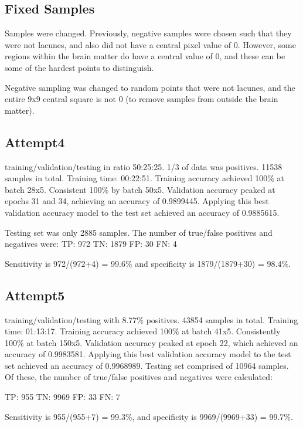 \subsection*{Fixed Samples}

Samples were changed. Previously, negative samples were chosen such that they were not lacunes, and also did not have a central pixel value of 0. However, some regions within the brain matter do have a central value of 0, and these can be some of the hardest points to distinguish.

Negative sampling was changed to random points that were not lacunes, and the entire 9x9 central square is not 0 (to remove samples from outside the brain matter). 

\subsection*{Attempt4}

training/validation/testing in ratio 50:25:25. 1/3 of data was positives. 11538 samples in total. Training time: 00:22:51.
Training accuracy achieved 100\% at batch 28x5. Consistent 100\% by batch 50x5. Validation accuracy peaked at epochs 31 and 34, achieving an accuracy of 0.9899445. Applying this best validation accuracy model to the test set achieved an accuracy of 0.9885615.

Testing set was only 2885 samples. The number of true/false positives and negatives were:
TP: 972
TN: 1879
FP: 30
FN: 4

Sensitivity is 972/(972+4) = 99.6\% and specificity is 1879/(1879+30) = 98.4\%.



\subsection*{Attempt5}

training/validation/testing with 8.77\% positives. 43854 samples in total. Training time: 01:13:17. Training accuracy achieved 100\% at batch 41x5. Consistently 100\% at batch 150x5. Validation accuracy peaked at epoch 22, which achieved an accuracy of 0.9983581. Applying this best validation accuracy model to the test set achieved an accuracy of 0.9968989.
Testing set comprised of 10964 samples. Of these, the number of true/false positives and negatives were calculated:

TP: 955
TN: 9969
FP: 33
FN: 7

Sensitivity is 955/(955+7) = 99.3\%, and specificity is 9969/(9969+33) = 99.7\%.


%